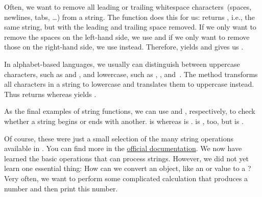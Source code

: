%
\begin{sloppypar}%
Often, we want to remove all leading or trailing whitespace characters~(spaces, newlines, tabs, \dots) from a string.
The  function does this for us:
 returns , i.e., the same string, but with the leading and trailing space removed.
If we only want to remove the spaces on the left-hand side, we use  and if we only want to remove those on the right-hand side, we use  instead.
Therefore,  yields  and  gives us .
\end{sloppypar}%
%
In alphabet-based languages, we usually can distinguish between uppercase characters, such as  and , and lowercase, such as , , and~.
The method  transforms all characters in a string to lowercase and  translates them to uppercase instead.
Thus  returns  whereas  yields .

As the final examples of string functions, we can use  and , respectively, to check whether a string begins or ends with another.
 is  whereas  is .
 is , too, but  is .

Of course, these were just a small selection of the many string operations available in \python.
You can find more in the \href{https://docs.python.org/3/library/stdtypes.html\#textseq}{official documentation}.%
\FloatBarrier%
\endhsection%
%
%
\label{sec:fstrings}%
%
%
%
%
We now have learned the basic operations that can process strings.
However, we did not yet learn one essential thing:
How can we convert an object, like an  or  value to a ?
Very often, we want to perform some complicated calculation that produces a number and then print this number.

